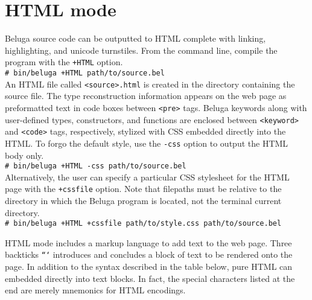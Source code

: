 \documentclass[11pt]{article}
\newcommand{\shellcmd}[1]{\\\indent\texttt{\# #1}\\}
\begin{document}

\section{HTML mode}
Beluga source code can be outputted to HTML complete with linking, highlighting, and unicode turnstiles. From the command line, compile the program with the \texttt{+HTML} option.
\shellcmd{bin/beluga +HTML path/to/source.bel}
An HTML file called \texttt{<source>.html} is created in the directory containing the source file. The type reconstruction information appears on the web page as preformatted text in code boxes between \texttt{<pre>} tags. Beluga keywords along with user-defined types, constructors, and functions are enclosed between \texttt{<keyword>} and \texttt{<code>} tags, respectively, stylized with CSS embedded directly into the HTML. To forgo the default style, use the \texttt{-css} option to output the HTML body only.
\shellcmd{bin/beluga +HTML -css path/to/source.bel}
Alternatively, the user can specify a particular CSS stylesheet for the HTML page with the \texttt{+cssfile} option. Note that filepaths must be relative to the directory in which the Beluga program is located, not the terminal current directory.  
\shellcmd{bin/beluga +HTML +cssfile path/to/style.css path/to/source.bel}

\newpage

HTML mode includes a markup language to add text to the web page. Three backticks \texttt{```} introduces and concludes a block of text to be rendered onto the page. In addition to the syntax described in the table below, pure HTML can embedded directly into text blocks. In fact, the special characters listed at the end are merely mnemonics for HTML encodings. \\
\end{document}
